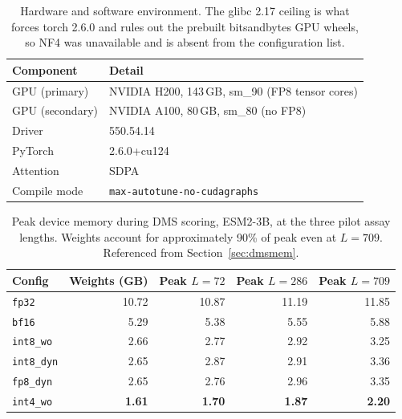 \documentclass[11pt]{article}
\newcommand{\cfg}[1]{\texttt{#1}}
\newcommand{\best}[1]{\textbf{#1}}
\begin{document}
\begin{table}[htb]
\centering
\caption{Hardware and software environment. The glibc 2.17 ceiling is what forces torch 2.6.0 and rules out the prebuilt bitsandbytes GPU wheels, so NF4 was unavailable and is absent from the configuration list.}
\label{tab:env}
\small
\begin{tabular}{ll}
\toprule
Component & Detail \\
\midrule
GPU (primary)  & NVIDIA H200, 143\,GB, sm\_90 (FP8 tensor cores) \\
GPU (secondary)& NVIDIA A100, 80\,GB, sm\_80 (no FP8) \\
Driver         & 550.54.14 \\
PyTorch        & 2.6.0+cu124 \\
Attention      & SDPA \\
Compile mode   & \texttt{max-autotune-no-cudagraphs} \\
\bottomrule
\end{tabular}
\end{table}

\begin{table}[htb]
\centering
\caption{Peak device memory during DMS scoring, ESM2-3B, at the three pilot
assay lengths. Weights account for approximately 90\% of peak even at $L=709$.
Referenced from Section~\ref{sec:dmsmem}.}
\label{tab:dmsmem}
\small
\begin{tabular}{lrrrr}
\toprule
Config & Weights (GB) & Peak $L{=}72$ & Peak $L{=}286$ & Peak $L{=}709$ \\
\midrule
\cfg{fp32}      & 10.72 & 10.87 & 11.19 & 11.85 \\
\cfg{bf16}      &  5.29 &  5.38 &  5.55 &  5.88 \\
\cfg{int8\_wo}  &  2.66 &  2.77 &  2.92 &  3.25 \\
\cfg{int8\_dyn} &  2.65 &  2.87 &  2.91 &  3.36 \\
\cfg{fp8\_dyn}  &  2.65 &  2.76 &  2.96 &  3.35 \\
\cfg{int4\_wo}  & \best{1.61} & \best{1.70} & \best{1.87} & \best{2.20} \\
\bottomrule
\end{tabular}
\end{table}
\end{document}
